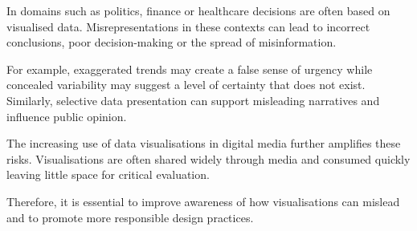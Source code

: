 In domains such as politics, finance or healthcare decisions are often based on visualised data. Misrepresentations in these contexts can lead to incorrect conclusions, poor decision-making or the spread of misinformation.

For example, exaggerated trends may create a false sense of urgency while concealed variability may suggest a level of certainty that does not exist. Similarly, selective data presentation can support misleading narratives and influence public opinion.

The increasing use of data visualisations in digital media further amplifies these risks. Visualisations are often shared widely through media and consumed quickly leaving little space for critical evaluation.

Therefore, it is essential to improve awareness of how visualisations can mislead and to promote more responsible design practices.







